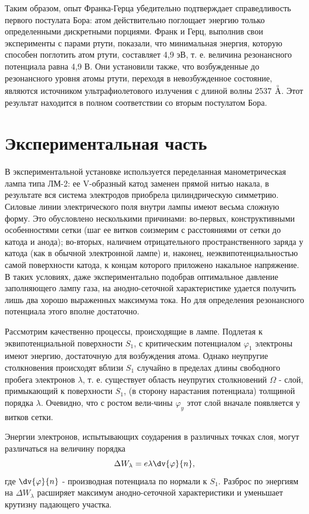 Таким образом, опыт Франка-Герца убедительно подтверждает справедливость первого постулата Бора: атом действительно поглощает энергию только определенными дискретными порциями. Франк и Герц, выполнив свои эксперименты с парами ртути, показали, что минимальная энергия, которую способен поглотить атом ртути, составляет 4,9 эВ, т. е. величина резонансного потенциала равна 4,9 В. Они установили также, что возбужденные до резонансного уровня атомы ртути, переходя в невозбужденное состояние, являются источником ультрафиолетового излучения с длиной волны 2537 $\buildrel _{\circ} \over {\mathrm{A}}$. Этот результат находится в полном соответствии со вторым постулатом Бора.

\section{Экспериментальная часть}

В экспериментальной установке используется переделанная манометрическая лампа типа ЛМ-2: ее V-образный катод заменен прямой нитью накала, в результате вся система электродов приобрела цилиндрическую симметрию. Силовые линии электрического поля внутри лампы имеют весьма сложную форму. Это обусловлено несколькими причинами: во-первых, конструктивными особенностями сетки (шаг ее витков соизмерим с расстояниями от сетки до катода и анода); во-вторых, наличием отрицательного пространственного заряда у катода (как в обычной электронной лампе) и, наконец, неэквипотенциальностью самой поверхности катода, к концам которого приложено накальное напряжение. В таких условиях, даже экспериментально подобрав оптимальное давление заполняющего лампу газа, на анодно-сеточной характеристике удается получить лишь два хорошо выраженных максимума тока. Но для определения резонансного потенциала этого вполне достаточно.

Рассмотрим качественно процессы, происходящие в лампе. Подлетая к эквипотенциальной поверхности $S_1$, с критическим потенциалом $\varphi_{1}$ электроны имеют энергию, достаточную для возбуждения атома. Однако неупругие столкновения происходят вблизи $S_1$ случайно в пределах длины свободного пробега электронов $\lambda$, т. е. существует область неупругих столкновений $\Omega$ - слой, примыкающий к поверхности $S_1$, (в сторону нарастания потенциала) толщиной порядка $\lambda$. Очевидно, что с ростом вели-чины $\varphi_{y}$ этот слой вначале появляется у витков сетки.

Энергии электронов, испытывающих соударения в различных точках слоя, могут различаться на величину порядка $$\Delta W_{\lambda}=e\lambda \dv{\varphi}{n},$$ 
где $\displaystyle{\dv{\varphi}{n}}$ - производная потенциала по нормали к $S_1$. Разброс по энергиям на $\Delta W_{\lambda}$ расширяет максимум анодно-сеточной характеристики и уменьшает крутизну падающего участка.

